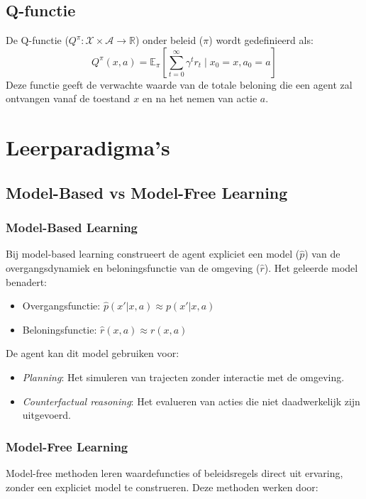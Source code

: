 \documentclass[a4paper,12pt]{report}
\begin{document}
\subsection{Q-functie}
De Q-functie (\(Q^\pi: \mathcal{X} \times \mathcal{A} \to \mathbb{R}\)) onder
beleid (\(\pi\)) wordt gedefinieerd als:
\[
    Q^\pi(x,a) = \mathbb{E}_\pi\left[\sum_{t=0}^\infty \gamma^t r_t \mid x_0 = x, a_0 = a\right]
\]
Deze functie geeft de verwachte waarde van de totale beloning die een agent zal
ontvangen vanaf de toestand \(x\) en na het nemen van actie \(a\).

\section{Leerparadigma's}
\subsection{Model-Based vs Model-Free Learning}
\subsubsection{Model-Based Learning}
Bij model-based learning construeert de agent expliciet een model (\(\hat{p}\))
van de overgangsdynamiek en beloningsfunctie van de omgeving (\(\hat{r}\)). Het
geleerde model benadert:

\begin{itemize}
    \item Overgangsfunctie: \(\hat{p}(x'|x,a) \approx p(x'|x,a)\)
    \item Beloningsfunctie: \(\hat{r}(x,a) \approx r(x,a)\)
\end{itemize}

De agent kan dit model gebruiken voor:

\begin{itemize}
    \item \textit{Planning}: Het simuleren van trajecten zonder interactie met de omgeving.
    \item \textit{Counterfactual reasoning}: Het evalueren van acties die niet daadwerkelijk zijn uitgevoerd.
\end{itemize}

\subsubsection{Model-Free Learning}
Model-free methoden leren waardefuncties of beleidsregels direct uit ervaring,
zonder een expliciet model te construeren. Deze methoden werken door:
\end{document}
